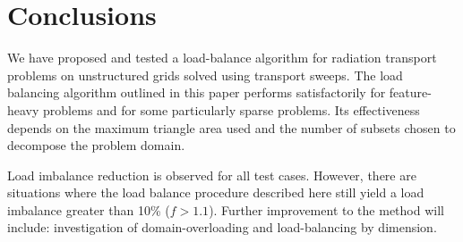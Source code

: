 \documentclass{anstrans}
\begin{document}
\section{Conclusions}

We have proposed and tested a load-balance algorithm for radiation transport problems on unstructured grids solved using transport sweeps. The load balancing algorithm outlined in this paper performs satisfactorily for feature-heavy problems and for some particularly sparse problems. Its effectiveness depends on the maximum triangle area used and the number of subsets chosen to decompose the problem domain. 

Load imbalance reduction is observed for all test cases. However, there are situations where the load balance procedure described here still yield a load imbalance greater than 10\% ($f > 1.1$). 
Further improvement to the method will include: investigation of domain-overloading \cite{mpadams2015} and load-balancing by dimension.








\end{document}
